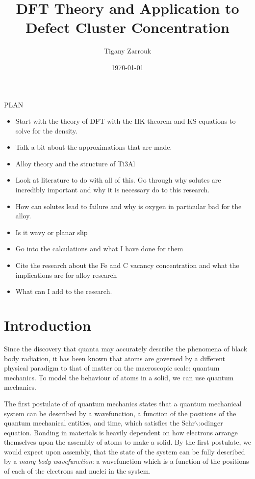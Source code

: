 \documentclass[11pt]{article}
\author{Tigany Zarrouk}
\date{\today}
\title{DFT Theory and Application to Defect Cluster Concentration}
\begin{document}
\maketitle
\tableofcontents

PLAN 

\begin{itemize}
\item Start with the theory of DFT with the HK theorem and KS equations to solve
for the density.
\item Talk a bit about the approximations that are made.
\item Alloy theory and the structure of Ti3Al
\item Look at literature to do with all of this. Go through why solutes are
incredibly important and why it is necessary do to this research.
\item How can solutes lead to failure and why is oxygen in particular bad for the alloy.
\item Is it wavy or planar slip
\item Go into the calculations and what I have done for them
\item Cite the research about the Fe and C vacancy concentration and what the
implications are for alloy research
\item What can I add to the research.
\end{itemize}

\section{Introduction}
\label{sec:orgbdb62f4}

Since the discovery that quanta may accurately describe the phenomena of black body radiation,
it has been known that atoms are governed by a different physical paradigm to that of matter on
the macroscopic scale: quantum mechanics. To model the behaviour of atoms in a solid, we can
use quantum mechanics.

The first postulate of of quantum mechanics states that a quantum mechanical system can be
described by a wavefunction, a function of the positions of the quantum mechanical entities,
and time, which satisfies the Schr$\backslash$:odinger equation. Bonding in materials is heavily dependent
on how electrons arrange themselves upon the assembly of atoms to make a solid. By the first postulate, we
would expect upon assembly, that the state of the system can be fully described by a \emph{many body
wavefunction}: a wavefunction which is a function of the positions of each of the electrons and
nuclei in the system.
\end{document}
